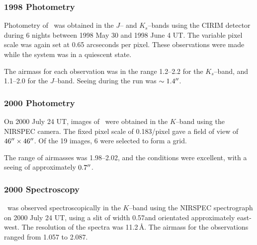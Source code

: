 \subsubsection{1998 Photometry}\label{cha:GROJ1655-40:sec:ObservationsOfJ1655:subsec:DetailsOfTheObservations:subsubsec:1998Photometry}

Photometry of \groj\ was obtained in the $J$-- and $K_s$--bands using
the CIRIM detector during 6 nights between 1998 May 30 and 1998 June 4
UT. The variable pixel scale was again set at 0.65 arcseconds per pixel. These observations were made while the system was in a quiescent state. %

\vspace{\myparskip}

The airmass for each observation was in the range 1.2--2.2 for the
$K_s$--band, and 1.1--2.0 for the $J$--band. Seeing during the run was $\sim 1.4\hbox{$^{\prime\prime}$}$. %

\subsubsection{2000 Photometry}\label{cha:GROJ1655-40:sec:ObservationsOfJ1655:subsec:DetailsOfTheObservations:subsubsec:2000Photometry}

On 2000 July 24 UT, images of \groj\ were obtained in the $K$--band
using the NIRSPEC camera.  The fixed pixel scale of 0.183\arcsec/pixel
gave a field of view of $46\hbox{$^{\prime\prime}$}\times46\hbox{$^{\prime\prime}$}$. Of the 19 images,
6 were selected to form a grid. %

\vspace{\myparskip}

The range of airmasses was 1.98--2.02, and the conditions were
excellent, with a seeing of approximately $0.7\hbox{$^{\prime\prime}$}$. %

\subsubsection{2000 Spectroscopy}\label{cha:GROJ1655-40:sec:ObservationsOfJ1655:subsec:DetailsOfTheObservations:subsubsec:2000Spectroscopy}

\groj\ was observed spectroscopically in the $K$--band using the NIRSPEC
spectrograph on 2000 July 24 UT, using a slit of width 0.57\arcsec and
orientated approximately east-west. The resolution of the spectra was
11.2\,\AA. The airmass for the observations ranged from 1.057 to
2.087. %

\vspace{\myparskip}

